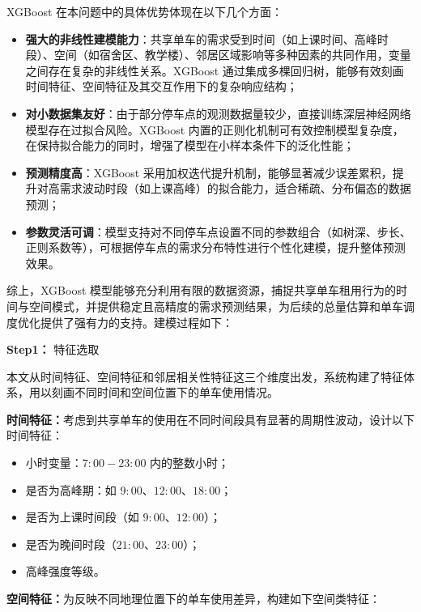 \documentclass[withoutpreface,bwprint]{cumcmthesis}
\begin{document}
XGBoost 在本问题中的具体优势体现在以下几个方面：

\begin{itemize}
    \item \textbf{强大的非线性建模能力}：共享单车的需求受到时间（如上课时间、高峰时段）、空间（如宿舍区、教学楼）、邻居区域影响等多种因素的共同作用，变量之间存在复杂的非线性关系。XGBoost 通过集成多棵回归树，能够有效刻画时间特征、空间特征及其交互作用下的复杂响应结构；
    
    \item \textbf{对小数据集友好}：由于部分停车点的观测数据量较少，直接训练深层神经网络模型存在过拟合风险。XGBoost 内置的正则化机制可有效控制模型复杂度，在保持拟合能力的同时，增强了模型在小样本条件下的泛化性能；
    
    \item \textbf{预测精度高}：XGBoost 采用加权迭代提升机制，能够显著减少误差累积，提升对高需求波动时段（如上课高峰）的拟合能力，适合稀疏、分布偏态的数据预测；
    
    \item \textbf{参数灵活可调}：模型支持对不同停车点设置不同的参数组合（如树深、步长、正则系数等），可根据停车点的需求分布特性进行个性化建模，提升整体预测效果。
\end{itemize}

综上，XGBoost 模型能够充分利用有限的数据资源，捕捉共享单车租用行为的时间与空间模式，并提供稳定且高精度的需求预测结果，为后续的总量估算和单车调度优化提供了强有力的支持。建模过程如下：

\textbf{Step1：} 特征选取

本文从时间特征、空间特征和邻居相关性特征这三个维度出发，系统构建了特征体系，用以刻画不同时间和空间位置下的单车使用情况。

\textbf{时间特征：}考虑到共享单车的使用在不同时间段具有显著的周期性波动，设计以下时间特征：

    \begin{itemize}
    \item 小时变量：$7{:}00{-}23{:}00$ 内的整数小时；
    \item 是否为高峰期：如 $9{:}00$、$12{:}00$、$18{:}00$；
    \item 是否为上课时间段（如 $9{:}00$、$12{:}00$）；
    \item 是否为晚间时段（$21{:}00$、$23{:}00$）；
    \item 高峰强度等级。
    \end{itemize}
    
\textbf{空间特征：}为反映不同地理位置下的单车使用差异，构建如下空间类特征：
\end{document}
